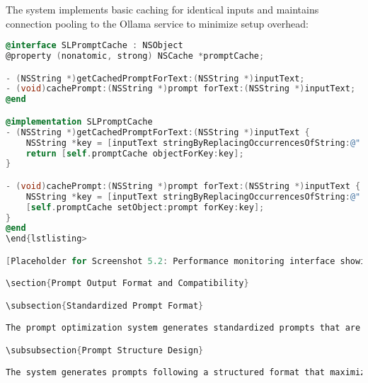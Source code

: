 The system implements basic caching for identical inputs and maintains connection pooling to the Ollama service to minimize setup overhead:

\begin{lstlisting}[language=C,basicstyle=\footnotesize\ttfamily,frame=single,breaklines=true,columns=flexible,caption={Simple Caching Implementation},label={lst:simple_caching}]
@interface SLPromptCache : NSObject
@property (nonatomic, strong) NSCache *promptCache;

- (NSString *)getCachedPromptForText:(NSString *)inputText;
- (void)cachePrompt:(NSString *)prompt forText:(NSString *)inputText;
@end

@implementation SLPromptCache
- (NSString *)getCachedPromptForText:(NSString *)inputText {
    NSString *key = [inputText stringByReplacingOccurrencesOfString:@" " withString:@""];
    return [self.promptCache objectForKey:key];
}

- (void)cachePrompt:(NSString *)prompt forText:(NSString *)inputText {
    NSString *key = [inputText stringByReplacingOccurrencesOfString:@" " withString:@""];
    [self.promptCache setObject:prompt forKey:key];
}
@end
\end{lstlisting>

[Placeholder for Screenshot 5.2: Performance monitoring interface showing response times and resource usage]

\section{Prompt Output Format and Compatibility}

\subsection{Standardized Prompt Format}

The prompt optimization system generates standardized prompts that are compatible with various text-to-image generation models. The output format follows established conventions for prompt structure while incorporating model-specific optimizations for enhanced effectiveness.

\subsubsection{Prompt Structure Design}

The system generates prompts following a structured format that maximizes effectiveness across different image generation models:


\end{lstlisting}

